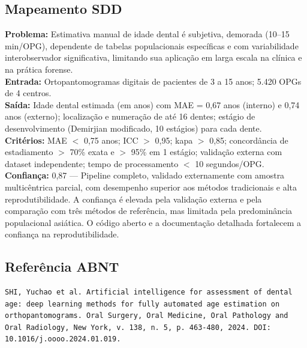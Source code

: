 \subsection{Mapeamento SDD}
\textbf{Problema:} Estimativa manual de idade dental é subjetiva,
demorada (10--15 min/OPG), dependente de tabelas populacionais
específicas e com variabilidade interobservador significativa,
limitando sua aplicação em larga escala na clínica e na prática
forense. \\
\textbf{Entrada:} Ortopantomogramas digitais de pacientes de 3 a 15
anos; 5.420 OPGs de 4 centros. \\
\textbf{Saída:} Idade dental estimada (em anos) com MAE = 0,67 anos
(interno) e 0,74 anos (externo); localização e numeração de até 16
dentes; estágio de desenvolvimento (Demirjian modificado, 10 estágios)
para cada dente. \\
\textbf{Critérios:} MAE $<$ 0,75 anos; ICC $>$ 0,95; kapa $>$ 0,85;
concordância de estadiamento $>$ 70\% exata e $>$ 95\% em 1 estágio;
validação externa com dataset independente; tempo de processamento
$<$ 10 segundos/OPG. \\
\textbf{Confiança:} 0,87 — Pipeline completo, validado externamente
com amostra multicêntrica parcial, com desempenho superior aos métodos
tradicionais e alta reprodutibilidade. A confiança é elevada pela
validação externa e pela comparação com três métodos de referência,
mas limitada pela predominância populacional asiática. O código
aberto e a documentação detalhada fortalecem a confiança na
reprodutibilidade.

\subsection{Referência ABNT}
\begin{verbatim}
SHI, Yuchao et al. Artificial intelligence for assessment of dental
age: deep learning methods for fully automated age estimation on
orthopantomograms. Oral Surgery, Oral Medicine, Oral Pathology and
Oral Radiology, New York, v. 138, n. 5, p. 463-480, 2024. DOI:
10.1016/j.oooo.2024.01.019.
\end{verbatim}
\endinput
